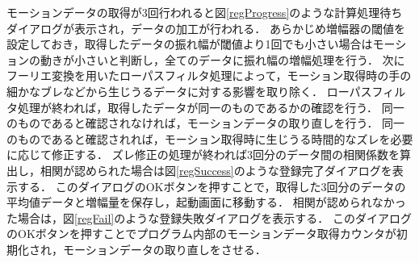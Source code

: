 \documentclass[11pt]{jreport}
\begin{document}
        モーションデータの取得が3回行われると図\ref{regProgress}のような計算処理待ちダイアログが表示され，データの加工が行われる．
        あらかじめ増幅器の閾値を設定しておき，取得したデータの振れ幅が閾値より1回でも小さい場合はモーションの動きが小さいと判断し，全てのデータに振れ幅の増幅処理を行う．
        次にフーリエ変換を用いたローパスフィルタ処理によって，モーション取得時の手の細かなブレなどから生じうるデータに対する影響を取り除く．
        ローパスフィルタ処理が終われば，取得したデータが同一のものであるかの確認を行う．
        同一のものであると確認されなければ，モーションデータの取り直しを行う．
        同一のものであると確認されれば，モーション取得時に生じうる時間的なズレを必要に応じて修正する．
        ズレ修正の処理が終われば3回分のデータ間の相関係数を算出し，相関が認められた場合は図\ref{regSuccess}のような登録完了ダイアログを表示する．
        このダイアログのOKボタンを押すことで，取得した3回分のデータの平均値データと増幅量を保存し，起動画面に移動する．
        相関が認められなかった場合は，図\ref{regFail}のような登録失敗ダイアログを表示する．
        このダイアログのOKボタンを押すことでプログラム内部のモーションデータ取得カウンタが初期化され，モーションデータの取り直しをさせる．
\end{document}

